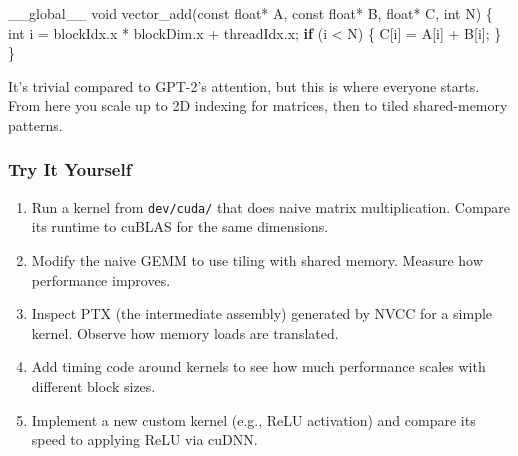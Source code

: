 \documentclass[
  letterpaper,
  DIV=11,
  numbers=noendperiod]{scrreprt}
\newenvironment{Shaded}{\begin{snugshade}}{\end{snugshade}}
\newcommand{\AttributeTok}[1]{\textcolor[rgb]{0.40,0.45,0.13}{#1}}
\newcommand{\ControlFlowTok}[1]{\textcolor[rgb]{0.00,0.23,0.31}{\textbf{#1}}}
\newcommand{\DataTypeTok}[1]{\textcolor[rgb]{0.68,0.00,0.00}{#1}}
\newcommand{\NormalTok}[1]{\textcolor[rgb]{0.00,0.23,0.31}{#1}}
\newcommand{\OperatorTok}[1]{\textcolor[rgb]{0.37,0.37,0.37}{#1}}
\providecommand{\tightlist}{%
  \setlength{\itemsep}{0pt}\setlength{\parskip}{0pt}}
\begin{document}
\begin{Shaded}
\begin{Highlighting}[]
\NormalTok{\_\_global\_\_ }\DataTypeTok{void}\NormalTok{ vector\_add}\OperatorTok{(}\AttributeTok{const} \DataTypeTok{float}\OperatorTok{*}\NormalTok{ A}\OperatorTok{,} \AttributeTok{const} \DataTypeTok{float}\OperatorTok{*}\NormalTok{ B}\OperatorTok{,} \DataTypeTok{float}\OperatorTok{*}\NormalTok{ C}\OperatorTok{,} \DataTypeTok{int}\NormalTok{ N}\OperatorTok{)} \OperatorTok{\{}
    \DataTypeTok{int}\NormalTok{ i }\OperatorTok{=}\NormalTok{ blockIdx}\OperatorTok{.}\NormalTok{x }\OperatorTok{*}\NormalTok{ blockDim}\OperatorTok{.}\NormalTok{x }\OperatorTok{+}\NormalTok{ threadIdx}\OperatorTok{.}\NormalTok{x}\OperatorTok{;}
    \ControlFlowTok{if} \OperatorTok{(}\NormalTok{i }\OperatorTok{\textless{}}\NormalTok{ N}\OperatorTok{)} \OperatorTok{\{}
\NormalTok{        C}\OperatorTok{[}\NormalTok{i}\OperatorTok{]} \OperatorTok{=}\NormalTok{ A}\OperatorTok{[}\NormalTok{i}\OperatorTok{]} \OperatorTok{+}\NormalTok{ B}\OperatorTok{[}\NormalTok{i}\OperatorTok{];}
    \OperatorTok{\}}
\OperatorTok{\}}
\end{Highlighting}
\end{Shaded}

It's trivial compared to GPT-2's attention, but this is where everyone
starts. From here you scale up to 2D indexing for matrices, then to
tiled shared-memory patterns.

\subsubsection{Try It Yourself}\label{try-it-yourself-58}

\begin{enumerate}
\def\labelenumi{\arabic{enumi}.}
\tightlist
\item
  Run a kernel from \texttt{dev/cuda/} that does naive matrix
  multiplication. Compare its runtime to cuBLAS for the same dimensions.
\item
  Modify the naive GEMM to use tiling with shared memory. Measure how
  performance improves.
\item
  Inspect PTX (the intermediate assembly) generated by NVCC for a simple
  kernel. Observe how memory loads are translated.
\item
  Add timing code around kernels to see how much performance scales with
  different block sizes.
\item
  Implement a new custom kernel (e.g., ReLU activation) and compare its
  speed to applying ReLU via cuDNN.
\end{enumerate}
\end{document}
